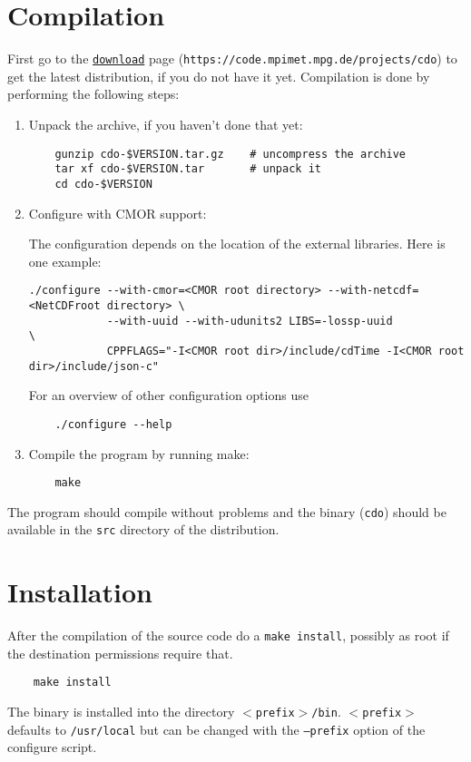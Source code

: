 \section{Compilation}

First go to the {\CDO}  \href{https://code.mpimet.mpg.de/projects/cdo}{\texttt{download}} page
(\texttt{https://code.mpimet.mpg.de/projects/cdo}) to get the latest distribution,
if you do not have it yet.
Compilation is done by performing the following steps:

\begin{enumerate}
\item Unpack the archive, if you haven't done that yet:
   
\begin{verbatim}
    gunzip cdo-$VERSION.tar.gz    # uncompress the archive
    tar xf cdo-$VERSION.tar       # unpack it
    cd cdo-$VERSION
\end{verbatim}

\item Configure {\CDO} with CMOR support:

The configuration depends on the location of the external libraries. Here is one example:

\begin{verbatim}
./configure --with-cmor=<CMOR root directory> --with-netcdf=<NetCDFroot directory> \
            --with-uuid --with-udunits2 LIBS=-lossp-uuid                           \
            CPPFLAGS="-I<CMOR root dir>/include/cdTime -I<CMOR root dir>/include/json-c"
\end{verbatim}

For an overview of other configuration options use

\begin{verbatim}
    ./configure --help
\end{verbatim}

\item Compile the program by running make:

\begin{verbatim}
    make
\end{verbatim}

\end{enumerate}

The program should compile without problems and the binary (\texttt{cdo}) 
should be available in the \texttt{src} directory of the distribution.


\section{Installation}

After the compilation of the source code do a \texttt{make install},
possibly as root if the destination permissions require that.

\begin{verbatim}
    make install
\end{verbatim} 

The binary is installed into the directory \texttt{$<$prefix$>$/bin}.
\texttt{$<$prefix$>$} defaults to \texttt{/usr/local} but can be changed with 
the \texttt{--prefix} option of the configure script. 
